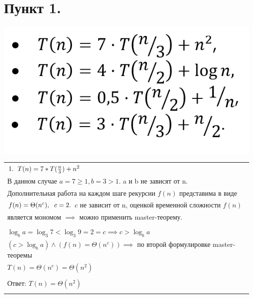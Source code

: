\documentclass[11pt,a4paper]{article} %
\begin{document}
\section*{Пункт 1.}

\def \flr#1{\left\lfloor #1 \right\rfloor}

\includegraphics[scale=0.45]{alg21.png}

\begin{tabular}{l}
    $ 1. \hspace*{6pt} T(n) = 7 * T(\frac{n}{3}) + n^2 $ \\
    В данном случае $ a = 7 \ge 1 , b = 3 > 1. $ a и b не зависят от n. \\
    Дополнительная работа на каждом шаге рекурсии $ f(n) $ представима в виде \\
    $ f(n) = \Theta(n^{c}), \hspace*{6pt} c = 2. $ $ c $ не зависит от n, оценкой временной сложности $ f(n) $ \\
    является мономом $ \implies $ можно применить master-теорему. \\
    \\
    $ \log_b{a} = \log_3{7} < \log_3{9} = 2 = c \implies c > \log_b{a} $ \\
    $ (c > \log_b{a}) \wedge (f(n) = \Theta(n^{c})) \implies $ по второй формулировке master-теоремы \\
    $ T(n) = \Theta(n^{c}) = \Theta(n^{2}) $ \\
    \\
    Ответ: $ T(n) = \Theta(n^{2}) $ \\
    \\
\end{tabular}
\end{document}
